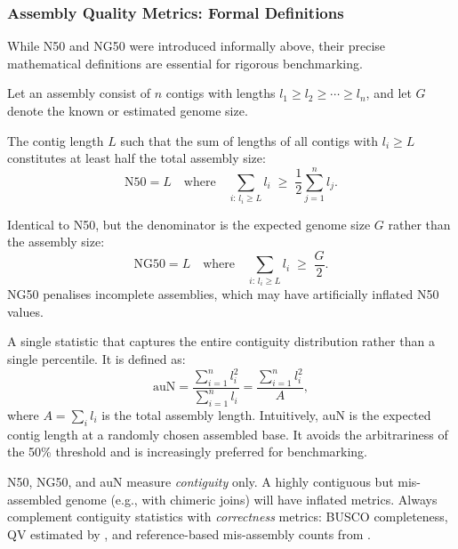\subsubsection{Assembly Quality Metrics: Formal Definitions}
\label{subsubsec:genomeseq:assembly_metrics}

While N50 and NG50 were introduced informally above, their precise mathematical definitions are essential for rigorous benchmarking.

Let an assembly consist of $n$ contigs with lengths $l_1 \geq l_2 \geq \cdots \geq l_n$, and let $G$ denote the known or estimated genome size.

\begin{description}[style=nextline]
  \item[N50] The contig length $L$ such that the sum of lengths of all contigs with $l_i \geq L$ constitutes at least half the total assembly size:
    \begin{equation}
    \label{eq:genomeseq:n50}
    \text{N50} = L \quad \text{where} \quad \sum_{i:\, l_i \geq L} l_i \;\geq\; \frac{1}{2}\sum_{j=1}^{n} l_j.
    \end{equation}
  \item[NG50] Identical to N50, but the denominator is the expected genome size $G$ rather than the assembly size:
    \begin{equation}
    \label{eq:genomeseq:ng50}
    \text{NG50} = L \quad \text{where} \quad \sum_{i:\, l_i \geq L} l_i \;\geq\; \frac{G}{2}.
    \end{equation}
    NG50 penalises incomplete assemblies, which may have artificially inflated N50 values.
  \item[auN (area under the Nx curve)] A single statistic that captures the entire contiguity distribution rather than a single percentile. It is defined as:
    \begin{equation}
    \label{eq:genomeseq:aun}
    \mathrm{auN} = \frac{\sum_{i=1}^{n} l_i^2}{\sum_{i=1}^{n} l_i} = \frac{\sum_{i=1}^{n} l_i^2}{A},
    \end{equation}
    where $A = \sum_i l_i$ is the total assembly length. Intuitively, auN is the expected contig length at a randomly chosen assembled base. It avoids the arbitrariness of the 50\% threshold and is increasingly preferred for benchmarking.
\end{description}

\begin{warningbox}[title={Contiguity Is Not Correctness}]
N50, NG50, and auN measure \emph{contiguity} only. A highly contiguous but mis-assembled genome (e.g., with chimeric joins) will have inflated metrics. Always complement contiguity statistics with \emph{correctness} metrics: BUSCO completeness, QV estimated by , and reference-based mis-assembly counts from .
\end{warningbox}

